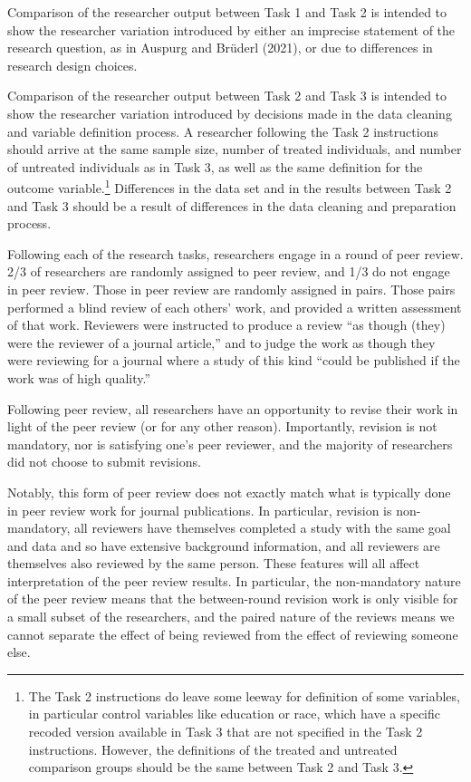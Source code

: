 \documentclass[
  letterpaper,
  DIV=11,
  numbers=noendperiod]{scrartcl}
\begin{document}
Comparison of the researcher output between Task 1 and Task 2 is
intended to show the researcher variation introduced by either an
imprecise statement of the research question, as in Auspurg and Brüderl
(2021), or due to differences in research design choices.

Comparison of the researcher output between Task 2 and Task 3 is
intended to show the researcher variation introduced by decisions made
in the data cleaning and variable definition process. A researcher
following the Task 2 instructions should arrive at the same sample size,
number of treated individuals, and number of untreated individuals as in
Task 3, as well as the same definition for the outcome
variable.\footnote{The Task 2 instructions do leave some leeway for
  definition of some variables, in particular control variables like
  education or race, which have a specific recoded version available in
  Task 3 that are not specified in the Task 2 instructions. However, the
  definitions of the treated and untreated comparison groups should be
  the same between Task 2 and Task 3.} Differences in the data set and
in the results between Task 2 and Task 3 should be a result of
differences in the data cleaning and preparation process.

Following each of the research tasks, researchers engage in a round of
peer review. 2/3 of researchers are randomly assigned to peer review,
and 1/3 do not engage in peer review. Those in peer review are randomly
assigned in pairs. Those pairs performed a blind review of each others'
work, and provided a written assessment of that work. Reviewers were
instructed to produce a review ``as though (they) were the reviewer of a
journal article,'' and to judge the work as though they were reviewing
for a journal where a study of this kind ``could be published if the
work was of high quality.''

Following peer review, all researchers have an opportunity to revise
their work in light of the peer review (or for any other reason).
Importantly, revision is not mandatory, nor is satisfying one's peer
reviewer, and the majority of researchers did not choose to submit
revisions.

Notably, this form of peer review does not exactly match what is
typically done in peer review work for journal publications. In
particular, revision is non-mandatory, all reviewers have themselves
completed a study with the same goal and data and so have extensive
background information, and all reviewers are themselves also reviewed
by the same person. These features will all affect interpretation of the
peer review results. In particular, the non-mandatory nature of the peer
review means that the between-round revision work is only visible for a
small subset of the researchers, and the paired nature of the reviews
means we cannot separate the effect of being reviewed from the effect of
reviewing someone else.
\end{document}
